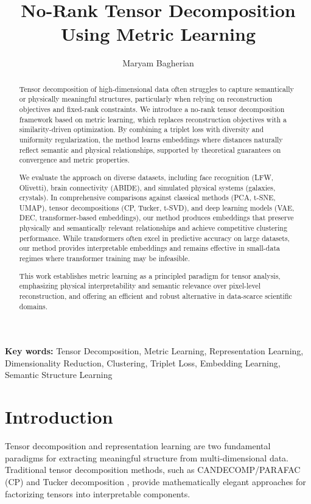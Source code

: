 \documentclass[a4paper,12pt,reqno]{amsart}
\title[]{
No-Rank Tensor Decomposition Using Metric Learning}
\author{Maryam Bagherian}
\theoremstyle{definition}
\theoremstyle{remark}
\begin{document}
\begin{abstract}
	Tensor decomposition of high-dimensional data often struggles to capture semantically or physically meaningful structures, particularly when relying on reconstruction objectives and fixed-rank constraints. We introduce a no-rank tensor decomposition framework based on metric learning, which replaces reconstruction objectives with a similarity-driven optimization. By combining a triplet loss with diversity and uniformity regularization, the method learns embeddings where distances naturally reflect semantic and physical relationships, supported by theoretical guarantees on convergence and metric properties.
	
	We evaluate the approach on diverse datasets, including face recognition (LFW, Olivetti), brain connectivity (ABIDE), and simulated physical systems (galaxies, crystals). In comprehensive comparisons against classical methods (PCA, t-SNE, UMAP), tensor decompositions (CP, Tucker, t-SVD), and deep learning models (VAE, DEC, transformer-based embeddings), our method produces embeddings that preserve physically and semantically relevant relationships and achieve competitive clustering performance. While transformers often excel in predictive accuracy on large datasets, our method provides interpretable embeddings and remains effective in small-data regimes where transformer training may be infeasible.
	
	This work establishes metric learning as a principled paradigm for tensor analysis, emphasizing physical interpretability and semantic relevance over pixel-level reconstruction, and offering an efficient and robust alternative in data-scarce scientific domains.
\end{abstract}


\maketitle

\noindent\textbf{Key words:} {\small }
Tensor Decomposition, Metric Learning, Representation Learning, Dimensionality Reduction, Clustering, Triplet Loss, Embedding Learning, Semantic Structure Learning
\section{Introduction}

Tensor decomposition and representation learning are two fundamental paradigms for extracting meaningful structure from multi-dimensional data. Traditional tensor decomposition methods, such as CANDECOMP/PARAFAC (CP) \cite{kolda2009tensor} and Tucker decomposition \cite{tucker1966some}, provide mathematically elegant approaches for factorizing tensors into interpretable components.
\end{document}
